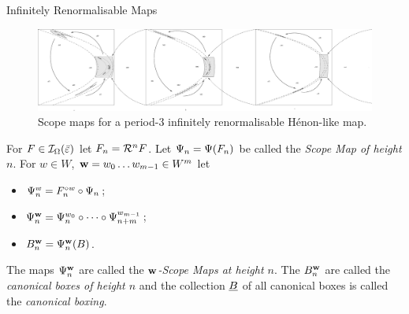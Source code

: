 \documentclass[final,hyperref={pdfpagelabels=false}]{beamer}
\theoremstyle{plain}%
\theoremstyle{definition}
\theoremstyle{remark}
\begin{document}
\begin{frame}{}
\begin{columns}[t]
\begin{column}{0.3\linewidth}
\begin{block}{Infinitely Renormalisable Maps}
\begin{figure}[tp]




\includegraphics[scale=0.37]{presentation-henon-2.eps}
\vspace*{0.2cm}
\caption{Scope maps for a period-3 infinitely renormalisable H\'enon-like map.}\label{fig:scopemaps-henon}
\end{figure}

For $F\in \I_\Omega(\bar\e)$ let  $F_n=\RH^n F$. Let $\MT_n=\MT(F_n)$ be called the \emph{Scope Map of height $n$}.
For $w\in W$, $\word{w}{}=w_0\ldots w_{m-1}\in W^m$ let
\begin{itemize}
\item $\MT_n^w=\o{w}{F_n}\circ \MT_n$;
\item $\MT_n^{\word{w}{}}=\MT_{n}^{w_0}\circ\cdots\circ\MT_{n+m}^{w_{m-1}}$;
\item $B_n^{\word{w}{}}=\MT_n^{\word{w}{}}(B)$.
\end{itemize}
The maps $\MT_n^{\word{w}{}}$ are called the \emph{$\word{w}{}$-Scope Maps at height $n$}. The $B_n^{\word{w}{}}$ are called the \emph{canonical boxes of height $n$} and the collection $\uline{B}$ of all canonical boxes is called the \emph{canonical boxing}. 
\end{block}


\end{column}
\end{columns}
\end{frame}
\end{document}
